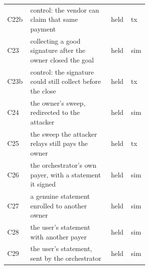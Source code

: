 \begin{tabular}{@{}lL{0.58\linewidth}ll@{}}
C22b & control: the vendor can claim that same payment & held & tx \\
C23 & collecting a good signature after the owner closed the goal & held & sim \\
C23b & control: the signature could still collect before the close & held & tx \\
C24 & the owner's sweep, redirected to the attacker & held & sim \\
C25 & the sweep the attacker relays still pays the owner & held & tx \\
C26 & the orchestrator's own payer, with a statement it signed & held & sim \\
C27 & a genuine statement enrolled to another owner & held & sim \\
C28 & the user's statement with another payer & held & sim \\
C29 & the user's statement, sent by the orchestrator & held & sim \\
\bottomrule
\end{tabular}
